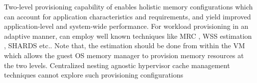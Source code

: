       
	Two-level provisioning capability of \dd{} enables holistic memory configurations 
	which can account for application characteristics and requirements, and yield improved
	application-level and system-wide performance. For workload provisioning in an adaptive manner, 
	\dd{} can employ well known techniques like MRC \cite{zhao2009dynamic, zhou2004dynamic}, 
	WSS estimation \cite{zhao2011low}, SHARDS \cite{waldspurger2015efficient} etc.. Note that, the estimation
	should be done from within the VM which allows the guest
	OS memory manager to provision memory resources at the
	two levels. Centralized nesting agnostic hypervisor cache
	management techniques cannot explore such provisioning
	configurations
      
      
      
    